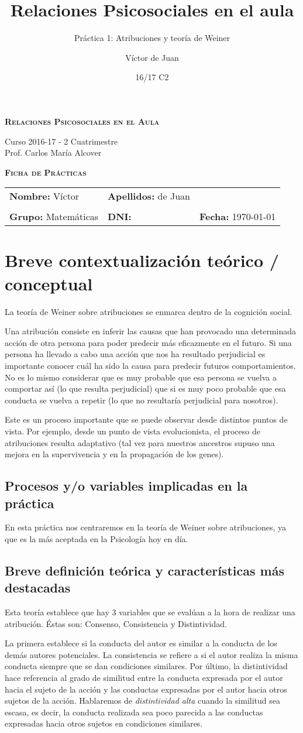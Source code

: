 \documentclass[palatino,nochap]{apuntesURJC}
\title{Relaciones Psicosociales en el aula}
\subtitle{Práctica 1: Atribuciones y teoría de Weiner}
\author{Víctor de Juan}
\date{16/17 C2}
\newcommand{\makeheader}[1]{
\begin{center}
\Large \textbf{\textsc{Relaciones Psicosociales en el Aula}}\\
\end{center}
\begin{center}
\large Curso 2016-17 - 2 Cuatrimestre\\
Prof. Carlos María Alcover
\end{center}

\begin{center}
\Large \textbf{\textsc{Ficha de Prácticas}}
\end{center}

\begin{center}
\begin{tabular}{lll}
\textbf{Nombre:} Víctor &  \textbf{Apellidos:} de Juan &\\
\vspace{0.3cm}&&\\
\textbf{Grupo:} Matemáticas 	& \textbf{DNI:}  & \textbf{Fecha:} #1
\end{tabular}
\end{center}
}
\begin{document}
\pagestyle{plain}
\maketitle

\makeheader{\today}

\section{Breve contextualización teórico / conceptual}

La teoría de Weiner sobre atribuciones se enmarca dentro de la cognición social.

Una atribución consiste en inferir las causas que han provocado una determinada acción de otra persona para poder predecir más eficazmente en el futuro.
%
Si una persona ha llevado a cabo una acción que nos ha resultado perjudicial es importante conocer cuál ha sido la causa para predecir futuros comportamientos.
%
No es lo mismo considerar que es muy probable que esa persona se vuelva a comportar así (lo que resulta perjudicial) que si es muy poco probable que esa conducta se vuelva a repetir (lo que no resultaría perjudicial para nosotros).

Este es un proceso importante que se puede observar desde distintos puntos de vista. %
Por ejemplo, desde un punto de vista evolucionista, el proceso de atribuciones resulta adaptativo (tal vez para nuestros ancestros supuso una mejora en la supervivencia y en la propagación de los genes). 

\subsection{Procesos y/o variables implicadas en la práctica}

En esta práctica nos centraremos en la teoría de Weiner sobre atribuciones, ya que es la más aceptada en la Psicología hoy en día.

\subsection{Breve definición teórica y características más destacadas}

Esta teoría establece que hay 3 variables que se evalúan a la hora de realizar una atribución. 
%
Éstas son: Consenso, Consistencia y Distintividad.

La primera establece si la conducta del autor es similar a la conducta de los demás autores potenciales.
%
La consistencia se refiere a si el autor realiza la misma conducta siempre que se dan condiciones similares.
%
Por último, la distintividad hace referencia al grado de similitud entre la conducta expresada por el autor hacia el sujeto de la acción y las conductas expresadas por el autor hacia otros sujetos de la acción. 
%
Hablaremos de \textit{distintividad alta} cuando la similitud sea escasa, es decir, la conducta realizada sea poco parecida a las conductas expresadas hacia otros sujetos en condiciones similares.
\end{document}
